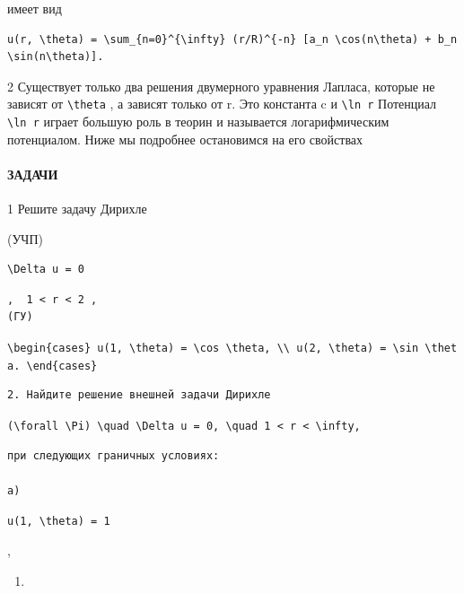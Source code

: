 \documentclass[
  ukrainian,
]{article}
\providecommand{\tightlist}{%
  \setlength{\itemsep}{0pt}\setlength{\parskip}{0pt}}
\begin{document}
имеет вид

\begin{verbatim}
u(r, \theta) = \sum_{n=0}^{\infty} (r/R)^{-n} [a_n \cos(n\theta) + b_n \sin(n\theta)].
\end{verbatim}

2 Существует только два решения двумерного уравнения Лапласа, которые не
зависят от \texttt{\textbackslash{}theta} , а зависят только от r. Это
константа c и \texttt{\textbackslash{}ln\ r} Потенциал
\texttt{\textbackslash{}ln\ r} играет большую роль в теорин и называется
логарифмическим потенциалом. Ниже мы подробнее остановимся на его
свойствах

\paragraph{ЗАДАЧИ}\label{ux437ux430ux434ux430ux447ux438-4}

1 Решите задачу Дирихле

(УЧП)

\begin{verbatim}
\Delta u = 0
\end{verbatim}

\begin{verbatim}
,  1 < r < 2 ,  
(ГУ)
\end{verbatim}

\texttt{\textbackslash{}begin\{cases\}\ u(1,\ \textbackslash{}theta)\ =\ \textbackslash{}cos\ \textbackslash{}theta,\ \textbackslash{}\textbackslash{}\ u(2,\ \textbackslash{}theta)\ =\ \textbackslash{}sin\ \textbackslash{}theta.\ \textbackslash{}end\{cases\}}

\begin{verbatim}
2. Найдите решение внешней задачи Дирихле
\end{verbatim}

\texttt{(\textbackslash{}forall\ \textbackslash{}Pi)\ \textbackslash{}quad\ \textbackslash{}Delta\ u\ =\ 0,\ \textbackslash{}quad\ 1\ \textless{}\ r\ \textless{}\ \textbackslash{}infty,}

\begin{verbatim}
при следующих граничных условиях:

a)
\end{verbatim}

\texttt{u(1,\ \textbackslash{}theta)\ =\ 1}

,

\begin{enumerate}
\def\labelenumi{\arabic{enumi})}
\setcounter{enumi}{5}
\tightlist
\item
\end{enumerate}
\end{document}
